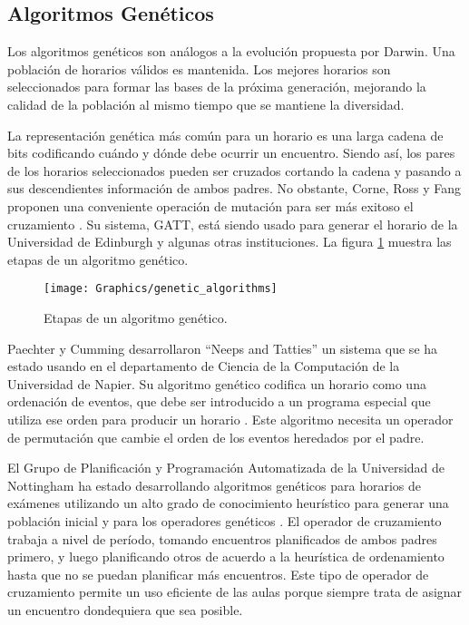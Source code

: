 \subsection{Algoritmos Genéticos}

Los algoritmos genéticos son análogos a la evolución propuesta por Darwin. Una población de horarios válidos
es mantenida. Los mejores horarios son seleccionados para formar las bases de la próxima generación, mejorando
la calidad de la población al mismo tiempo que se mantiene la diversidad.

La representación genética más común para un horario es una larga cadena de bits codificando cuándo y dónde
debe ocurrir un encuentro. Siendo así, los pares de los horarios seleccionados pueden ser cruzados cortando
la cadena y pasando a sus descendientes información de ambos padres. No obstante, Corne, Ross y Fang proponen
una conveniente operación de mutación para ser más exitoso el cruzamiento \cite{D Corne and P Ross and HL Fang}.
Su sistema, GATT, está siendo usado para generar el horario de la Universidad de Edinburgh y algunas otras
instituciones. La figura \ref{genetic algorithms steps} muestra las etapas de un algoritmo gen\'etico.

\begin{figure}
	\begin{center}
		\texttt{[image: Graphics/genetic\_algorithms]}
		\caption{Etapas de un algoritmo genético.}	
		\label{genetic algorithms steps}	
	\end{center}	
\end{figure}

Paechter y Cumming desarrollaron ``Neeps and Tatties'' un sistema que se ha estado usando en el departamento
de Ciencia de la Computación de la Universidad de Napier. Su algoritmo genético codifica un horario como una ordenación
de eventos, que debe ser introducido a un programa especial que utiliza ese orden para producir un horario
\cite{B Paechter* and A Cumming* and H Luchian}. Este algoritmo necesita un operador de permutación 
que cambie el orden de los eventos heredados por el padre.

El Grupo de Planificación y Programación Automatizada de la Universidad de Nottingham ha estado desarrollando
algoritmos genéticos para horarios de exámenes utilizando un alto grado de conocimiento heurístico para generar
una población inicial y para los operadores genéticos \cite{EK Burke and DG Elliman and RF Weare 1, 
EK Burke and DG Elliman and RF Weare 2, EK Burke and DG Elliman and RF Weare 3}. El operador de cruzamiento
trabaja a nivel de período, tomando encuentros planificados de ambos padres primero, y luego planificando
otros de acuerdo a la heurística de ordenamiento hasta que no se puedan planificar más encuentros. Este tipo de operador de cruzamiento permite un uso eficiente de las aulas porque siempre trata de asignar un encuentro dondequiera que sea posible.

